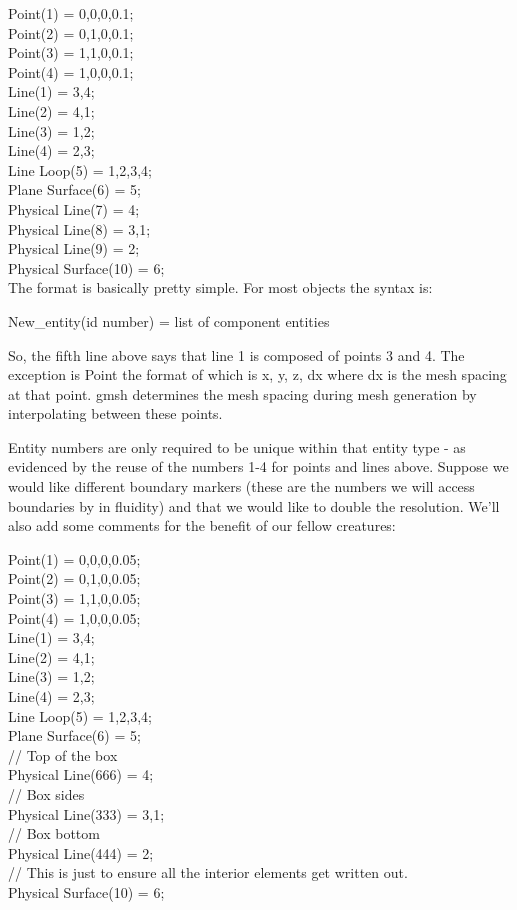  Point(1) = {0,0,0,0.1}; \\
 Point(2) = {0,1,0,0.1}; \\ 
 Point(3) = {1,1,0,0.1}; \\
 Point(4) = {1,0,0,0.1}; \\
 Line(1) = {3,4}; \\
 Line(2) = {4,1}; \\
 Line(3) = {1,2}; \\
 Line(4) = {2,3}; \\
 Line Loop(5) = {1,2,3,4}; \\
 Plane Surface(6) = {5}; \\
 Physical Line(7) = {4}; \\
 Physical Line(8) = {3,1}; \\
 Physical Line(9) = {2}; \\
 Physical Surface(10) = {6}; \\

The format is basically pretty simple. For most objects the syntax is:

 New\_entity(id number) = {list of component entities}

So, the fifth line above says that line 1 is composed of points 3 and 4. The exception is Point the format of which is {x, y, z, dx} where dx is the mesh spacing at that point. gmsh determines the mesh spacing during mesh generation by interpolating between these points.

Entity numbers are only required to be unique within that entity type - as evidenced by the reuse of the numbers 1-4 for points and lines above. Suppose we would like different boundary markers (these are the numbers we will access boundaries by in fluidity) and that we would like to double the resolution. We'll also add some comments for the benefit of our fellow creatures:

 Point(1) = {0,0,0,0.05}; \\
 Point(2) = {0,1,0,0.05}; \\
 Point(3) = {1,1,0,0.05}; \\
 Point(4) = {1,0,0,0.05}; \\
 Line(1) = {3,4};  \\
 Line(2) = {4,1}; \\
 Line(3) = {1,2}; \\
 Line(4) = {2,3}; \\
 Line Loop(5) = {1,2,3,4}; \\
 Plane Surface(6) = {5}; \\
 // Top of the box \\
 Physical Line(666) = {4}; \\
 // Box sides \\
 Physical Line(333) = {3,1}; \\
 // Box bottom \\
 Physical Line(444) = {2}; \\
 // This is just to ensure all the interior elements get written out. \\
 Physical Surface(10) = {6}; \\


